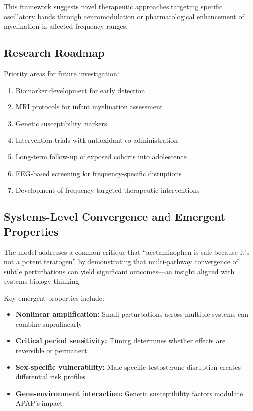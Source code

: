 \documentclass[11pt]{article}
\let\oldsubsection\subsection
\renewcommand{\subsection}[1]{\oldsubsection{#1}\setlength{\leftskip}{0.75em}}
\begin{document}
This framework suggests novel therapeutic approaches targeting specific oscillatory bands through neuromodulation or pharmacological enhancement of myelination in affected frequency ranges.

\subsection{Research Roadmap}
Priority areas for future investigation:
\begin{enumerate}
\item Biomarker development for early detection \citep{ji2020}
\item MRI protocols for infant myelination assessment \citep{baker2020}
\item Genetic susceptibility markers \citep{leppert2019,schultz2008}
\item Intervention trials with antioxidant co-administration \citep{parker2020}
\item Long-term follow-up of exposed cohorts into adolescence \citep{liew2021}
\item EEG-based screening for frequency-specific disruptions
\item Development of frequency-targeted therapeutic interventions
\end{enumerate}

\subsection{Systems-Level Convergence and Emergent Properties}

The model addresses a common critique that ``acetaminophen is safe because it's not a potent teratogen'' by demonstrating that multi-pathway convergence of subtle perturbations can yield significant outcomes—an insight aligned with systems biology thinking. 

Key emergent properties include:
\begin{itemize}
    \item \textbf{Nonlinear amplification:} Small perturbations across multiple systems can combine supralinearly
    \item \textbf{Critical period sensitivity:} Timing determines whether effects are reversible or permanent
    \item \textbf{Sex-specific vulnerability:} Male-specific testosterone disruption creates differential risk profiles
    \item \textbf{Gene-environment interaction:} Genetic susceptibility factors modulate APAP's impact
\end{itemize}
\end{document}
